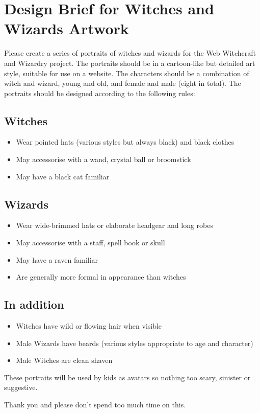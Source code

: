 \section{Design Brief for Witches and Wizards Artwork}\label{appendix:portraits}

Please create a series of portraits of witches and wizards for the Web Witchcraft and Wizardry project. The portraits should be in a cartoon-like but detailed art style, suitable for use on a website. The characters should be a combination of witch and wizard, young and old, and female and male (eight in total). The portraits should be designed according to the following rules:

\subsection*{Witches}

\begin{itemize}
    \item Wear pointed hats (various styles but always black) and black clothes
    \item May accessorise with a wand, crystal ball or broomstick
    \item May have a black cat familiar
\end{itemize}

\subsection*{Wizards}

\begin{itemize}
    \item Wear wide-brimmed hats or elaborate headgear and long robes
    \item May accessorise with a staff, spell book or skull
    \item May have a raven familiar
    \item Are generally more formal in appearance than witches
\end{itemize}

\subsection*{In addition}

\begin{itemize}
    \item Witches have wild or flowing hair when visible
    \item Male Wizards have beards (various styles appropriate to age and character)
    \item Male Witches are clean shaven
\end{itemize}

These portraits will be used by kids as avatars so nothing too scary, sinister or suggestive.

Thank you and please don't spend too much time on this.